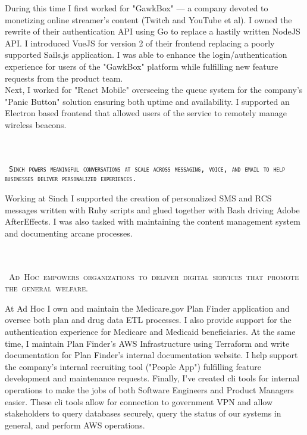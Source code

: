\documentclass{muratcan_cv}
\begin{document}
    \indent \indent \begin{minipage}{0.96\linewidth} \footnotesize
     During this time I first worked for "GawkBox" — a company devoted to monetizing online streamer's content (Twitch and YouTube et al). I owned the rewrite of their authentication API using Go to replace a hastily written NodeJS API. I introduced VueJS for version 2 of their frontend replacing a poorly supported Sails.js application. I was able to enhance the login/authentication experience for users of the "GawkBox" platform while fulfilling new feature requests from the product team. \\ Next, I worked for "React Mobile" overseeing the queue system for the company's "Panic Button" solution ensuring both uptime and availability. I supported an Electron based frontend that allowed users of the service to remotely manage wireless beacons.
    \end{minipage} \\[0.1cm]\\
    \mbox { \scshape \hspace{1.2em} \tiny{\texttt{Sinch powers meaningful conversations at scale across
    messaging, voice, and email to help businesses deliver personalized experiences.}}}\\
    \indent \indent \begin{minipage}{0.96\linewidth} \footnotesize
     Working at Sinch I supported the creation of personalized SMS and RCS messages written with Ruby scripts and glued together with Bash driving Adobe AfterEffects. I was also tasked with maintaining the content management system and documenting arcane processes.
    \end{minipage} \\[0.1cm]\\
    \mbox { \scshape \hspace{1.2em} \tiny{Ad Hoc empowers organizations to deliver digital
    services that promote the general welfare.}}\\
    \indent \indent \begin{minipage}{0.96\linewidth} \footnotesize
     At Ad Hoc I own and maintain the Medicare.gov Plan Finder application and oversee both plan and drug data ETL processes. I also provide support for the authentication experience for Medicare and Medicaid beneficiaries. At the same time, I maintain Plan Finder's AWS Infrastructure using Terraform and write documentation for Plan Finder's internal documentation website. I help support the company's internal recruiting tool ("People App") fulfilling feature development and maintenance requests. Finally, I've created cli tools for internal operations to make the jobs of both Software Engineers and Product Managers easier. These cli tools allow for connection to government VPN and allow stakeholders to query databases securely, query the status of our systems in general, and perform AWS operations.
    \end{minipage} \\[0.1cm]\\
%
\end{document}
